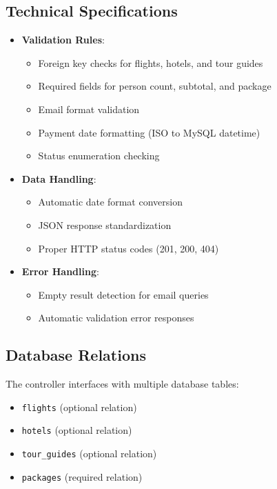 \subsection{Technical Specifications}
\begin{itemize}
    \item \textbf{Validation Rules}:
    \begin{itemize}
        \item Foreign key checks for flights, hotels, and tour guides
        \item Required fields for person count, subtotal, and package
        \item Email format validation
        \item Payment date formatting (ISO to MySQL datetime)
        \item Status enumeration checking
    \end{itemize}
    
    \item \textbf{Data Handling}:
    \begin{itemize}
        \item Automatic date format conversion
        \item JSON response standardization
        \item Proper HTTP status codes (201, 200, 404)
    \end{itemize}
    
    \item \textbf{Error Handling}:
    \begin{itemize}
        \item Empty result detection for email queries
        \item Automatic validation error responses
    \end{itemize}
\end{itemize}

\subsection{Database Relations}
The controller interfaces with multiple database tables:
\begin{itemize}
    \item \texttt{flights} (optional relation)
    \item \texttt{hotels} (optional relation)
    \item \texttt{tour\_guides} (optional relation)
    \item \texttt{packages} (required relation)
\end{itemize}

